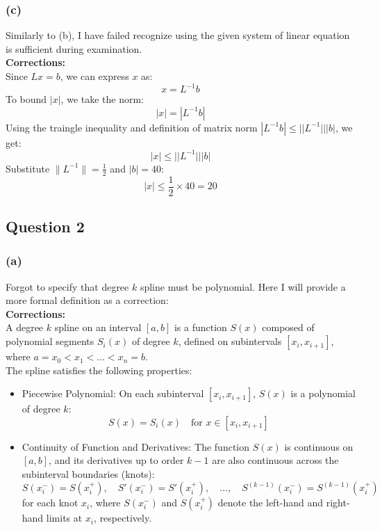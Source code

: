 \documentclass[12pt]{article}
\begin{document}
\subsubsection{(c)}
Similarly to (b), I have failed recognize using the given system of linear equation is sufficient during examination.
\\
\textbf{Corrections: }
\\
Since \( Lx = b \), we can express \( x \) as:
\[
    x = L^{-1} b
\]
To bound \( |x| \), we take the norm:
\[
    |x| = |L^{-1} b|
\]
Using the traingle inequality and definition of matrix norm \( |L^{-1} b| \leq ||L^{-1}|| |b| \), we get:
\[
    |x| \leq ||L^{-1}|| |b|
\]
Substitute \( \|L^{-1}\| = \frac{1}{2} \) and \( |b| = 40 \):
\[
    |x| \leq \frac{1}{2} \times 40 = 20
\]

\subsection*{Question 2}

\subsubsection{(a)}
Forgot to specify that degree $k$ spline must be polynomial. Here I will provide a more formal definition as a correction:
\\
\textbf{Corrections: }
\\
A degree \( k \) spline on an interval \([a, b]\) is a function \( S(x) \) composed of polynomial segments \( S_i(x) \) of degree \( k \), defined on subintervals \([x_i, x_{i+1}]\), where \( a = x_0 < x_1 < \dots < x_n = b \).
\\
The spline satisfies the following properties:
\begin{itemize}
    \item Piecewise Polynomial: On each subinterval \([x_i, x_{i+1}]\), \( S(x) \) is a polynomial of degree \( k \):
        \[
            S(x) = S_i(x) \quad \text{for } x \in [x_i, x_{i+1}]
        \]
    \item Continuity of Function and Derivatives: The function \( S(x) \) is continuous on \([a, b]\), and its derivatives up to order \( k-1 \) are also continuous across the subinterval boundaries (knots):
        \[
            S(x_i^-) = S(x_i^+), \quad S'(x_i^-) = S'(x_i^+), \quad \dots, \quad S^{(k-1)}(x_i^-) = S^{(k-1)}(x_i^+)
        \]
        for each knot \( x_i \), where \( S(x_i^-) \) and \( S(x_i^+) \) denote the left-hand and right-hand limits at \( x_i \), respectively.
\end{itemize}
\end{document}
